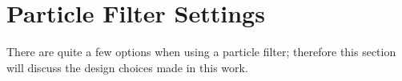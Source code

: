 %
%
%

\section{Particle Filter Settings}
There are quite a few options when using a particle filter; therefore this
section will discuss the design choices made in this work.

